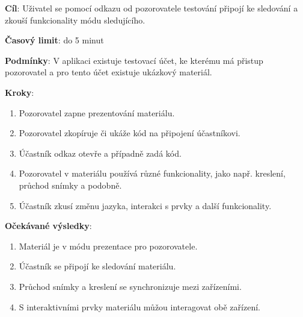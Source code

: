 \vspace{1em}

\textbf{Cíl}: Uživatel se pomocí odkazu od pozorovatele testování připojí ke sledování a zkouší funkcionality módu sledujícího.

\textbf{Časový limit}: do 5 minut

\textbf{Podmínky}:  V aplikaci existuje testovací účet, ke kterému má přistup pozorovatel a pro tento účet existuje ukázkový materiál. 

\textbf{Kroky}:

\begin{enumerate}[leftmargin=1.4cm]
    \item Pozorovatel zapne prezentování materiálu.
    \item Pozorovatel zkopíruje či ukáže kód na připojení účastníkovi.
    \item Účastník odkaz otevře a případně zadá kód.
    \item Pozorovatel v materiálu používá různé funkcionality, jako např. kreslení, průchod snímky a podobně.
    \item Účastník zkusí změnu jazyka, interakci s prvky a další funkcionality.
\end{enumerate}

\textbf{Očekávané výsledky}:

\begin{enumerate}[leftmargin=1.4cm]
    \item Materiál je v módu prezentace pro pozorovatele.
    \item Účastník se připojí ke sledování materiálu.
    \item Průchod snímky a kreslení se synchronizuje mezi zařízeními.
    \item S interaktivními prvky materiálu můžou interagovat obě zařízení.
\end{enumerate}